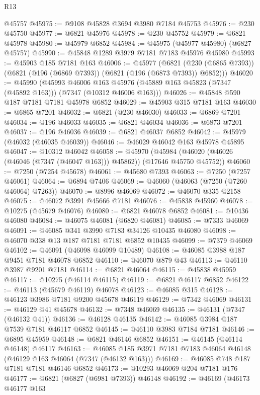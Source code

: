 \begin{lexlean}{R13}
\begin{coremodule}
    @45757
@45975 := @9108 @45828 @3694 @3980 @7184 @45753
@45976 := @230 @45750
@45977 := @6821 @45976
@45978 := @230 @45752
@45979 := @6821 @45978
@45980 := @45979 @6852
@45984 := @45975 (@45977 @45980) (@6827 @45757)
@45990 := @45848 @1289 @3979 @7181 @7183 @45976 @45980
@45993 := @45903 @185 @7181 @163
@46006 := @45977
    (@6821 (@230 (@6865 @7393)) (@6821 (@196 (@6869 @7393)) (@6821 (@196 (@6873 @7393)) @6852)))
@46020 := @45990
    (@45993
      @46006
      @163
      @45976
      (@45889 @163 @45823 (@7347 (@45892 @163)))
      (@7347 (@10312 @46006 @163)))
@46026 := @45848 @590 @187 @7181 @7181 @45978 @6852
@46029 := @45903 @315 @7181 @163
@46030 := @6865 @7201
@46032 := @6821 (@230 @46030)
@46033 := @6869 @7201
@46034 := @196 @46033
@46035 := @6821 @46034
@46036 := @6873 @7201
@46037 := @196 @46036
@46039 := @6821 @46037 @6852
@46042 := @45979 (@46032 (@46035 @46039))
@46046 := @46029 @46042 @163 @45978 @45895
@46047 := @10312 @46042
@46058 := @45970
    (@45984 (@46020 (@46026 (@46046 (@7347 (@46047 @163))) @45862)) (@17646 @45750 @45752))
@46060 := @7250 (@7254 @45678)
@46061 := @45680 @7393
@46063 := @7250 (@7257 @46061)
@46064 := @6894 @7406
@46069 := @46060 (@46063 (@7250 (@7260 @46064) @7263))
@46070 := @8996 @46069
@46072 := @46070 @335 @2158
@46075 := @46072 @3991 @45666 @7181
@46076 := @45838 @45960
@46078 := @10275 (@45679 @46076)
@46080 := @6821 @46078 @6852
@46081 := @10436 @46080
@46084 := @46075 @46081 (@6820 @46081)
@46085 := @7333 @46069
@46091 := @46085 @341 @3990 @7183 @34126 @10435 @46080
@46098 := @46070 @338 @13 @187 @7181 @7181 @6852 @10435
@46099 := @7379 @46069
@46102 := @46091 (@46098 @46099 @10489)
@46108 := @46085 @3988 @187 @9451 @7181 @46078 @6852
@46110 := @46070 @879 @43
@46113 := @46110 @3987 @9201 @7181
@46114 := @6821 @46064
@46115 := @45838 @45959
@46117 := @10275 (@46114 @46115)
@46119 := @6821 @46117 @6852
@46122 := @46113 (@45679 @46119) @46078
@46123 := @46085 @315
@46128 := @46123 @3986 @7181 @9200 @45678 @46119
@46129 := @7342 @46069
@46131 := @46129 @41 @45678
@46132 := @7348 @46069
@46135 := @46131 (@7347 (@46132 @41))
@46136 := @46128 @46135
@46142 := @46085 @3984 @187 @7539 @7181 @46117 @6852
@46145 := @46110 @3983 @7184 @7181
@46146 := @6895 @45959
@46148 := @6821 @46146 @6852
@46151 := @46145 (@46114 @46148) @46117
@46163 := @46085 @185 @3971 @7181 @7183 @46064 @46148 (@46129 @163 @46064 (@7347 (@46132 @163)))
@46169 := @46085 @748 @187 @7181 @7181 @46146 @6852
@46173 := @10293 @46069 @204 @7181 @176
@46177 := @6821 (@6827 (@6981 @7393)) @46148
@46192 := @46169
    (@46173
      @46177
      @163

\end{coremodule}
\end{lexlean}
